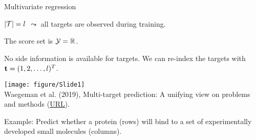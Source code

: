 \documentclass[11pt,compress,t,notes=noshow, xcolor=table]{beamer}
\begin{document}
\begin{frame}{Multivariate regression}
    \begin{itemize}
        \item $|\mathcal{T}|=l$ $\leadsto$ all targets are observed during training. 

        \begin{minipage}{0.45\textwidth}    
        
            \item The score set is $\mathcal{Y} = \mathbb{R}$. 

            \item No side information is available for targets. We can re-index the targets with $\mathbf{t} = (1, 2, \ldots, l)^T$. 
        \end{minipage}
        \hfill
        \begin{minipage}{0.45\textwidth}    
            \begin{center} 	
            \texttt{[image: figure/Slide1]} 	\tiny
            \\ Waegeman et al. (2019), Multi-target prediction:
            A unifying view on problems and methods (\href{https://arxiv.org/pdf/1809.02352.pdf}{\underline{URL}}).

            \end{center}
        \end{minipage}
    \end{itemize}

	Example: Predict whether a protein (rows) will bind to a set of experimentally developed small molecules (columns).
%
\end{frame}
\end{document}
